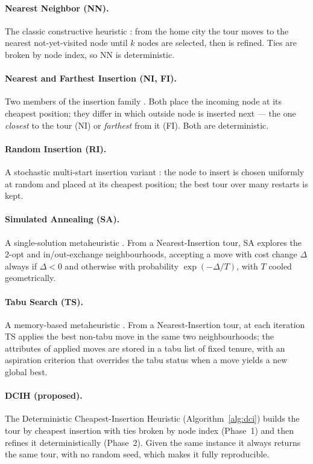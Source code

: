 \documentclass[sn-chicago]{sn-jnl}
\begin{document}
\paragraph{Nearest Neighbor (NN).} The classic constructive heuristic
\citep{rosenkrantz1977}: from the home city the tour moves to the nearest
not-yet-visited node until $k$ nodes are selected, then is refined. Ties are broken
by node index, so NN is deterministic.

\paragraph{Nearest and Farthest Insertion (NI, FI).} Two members of the insertion
family \citep{rosenkrantz1977,bentley1992}. Both place the incoming node at its
cheapest position; they differ in which outside node is inserted next --- the one
\emph{closest} to the tour (NI) or \emph{farthest} from it (FI). Both are
deterministic.

\paragraph{Random Insertion (RI).} A stochastic multi-start insertion variant
\citep{rosenkrantz1977}: the node to insert is chosen uniformly at random and
placed at its cheapest position; the best tour over many restarts is kept.

\paragraph{Simulated Annealing (SA).} A single-solution metaheuristic
\citep{kirkpatrick1983,cerny1985}. From a Nearest-Insertion tour, SA explores the
2-opt and in/out-exchange neighbourhoods, accepting a move with cost change
$\Delta$ always if $\Delta<0$ and otherwise with probability $\exp(-\Delta/T)$,
with $T$ cooled geometrically.

\paragraph{Tabu Search (TS).} A memory-based metaheuristic
\citep{glover1986,gloverlaguna1997,knox1994}. From a Nearest-Insertion tour, at
each iteration TS applies the best non-tabu move in the same two neighbourhoods;
the attributes of applied moves are stored in a tabu list of fixed tenure, with an
aspiration criterion that overrides the tabu status when a move yields a new global
best.

\paragraph{DCIH (proposed).} The Deterministic Cheapest-Insertion Heuristic
(Algorithm~\ref{alg:dci}) builds the tour by cheapest insertion with ties broken by
node index (Phase~1) and then refines it deterministically (Phase~2). Given the same
instance it always returns the same tour, with no random seed, which makes it fully
reproducible.
\end{document}

